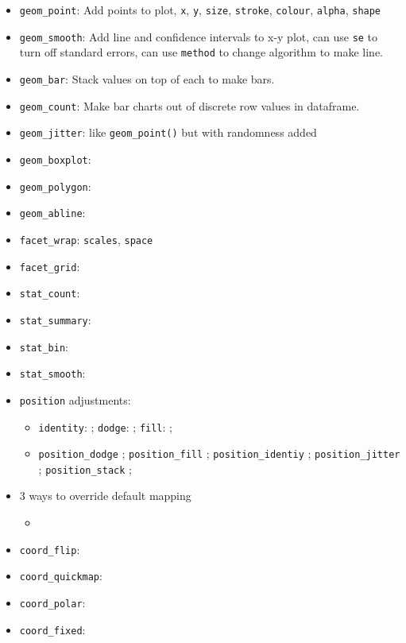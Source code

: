\documentclass[]{book}
\providecommand{\tightlist}{%
  \setlength{\itemsep}{0pt}\setlength{\parskip}{0pt}}
\theoremstyle{definition}
\theoremstyle{definition}
\theoremstyle{definition}
\theoremstyle{remark}
\begin{document}
\begin{itemize}
\tightlist
\item
  \texttt{geom\_point}: Add points to plot, \texttt{x}, \texttt{y},
  \texttt{size}, \texttt{stroke}, \texttt{colour}, \texttt{alpha},
  \texttt{shape}
\item
  \texttt{geom\_smooth}: Add line and confidence intervals to x-y plot,
  can use \texttt{se} to turn off standard errors, can use
  \texttt{method} to change algorithm to make line.
\item
  \texttt{geom\_bar}: Stack values on top of each to make bars.
\item
  \texttt{geom\_count}: Make bar charts out of discrete row values in
  dataframe.
\item
  \texttt{geom\_jitter}: like \texttt{geom\_point()} but with randomness
  added
\item
  \texttt{geom\_boxplot}:
\item
  \texttt{geom\_polygon}:
\item
  \texttt{geom\_abline}:
\item
  \texttt{facet\_wrap}: \texttt{scales}, \texttt{space}
\item
  \texttt{facet\_grid}:
\item
  \texttt{stat\_count}:
\item
  \texttt{stat\_summary}:
\item
  \texttt{stat\_bin}:
\item
  \texttt{stat\_smooth}:
\item
  \texttt{position} adjustments:

  \begin{itemize}
  \tightlist
  \item
    \texttt{identity}: ; \texttt{dodge}: ; \texttt{fill}: ;
  \item
    \texttt{position\_dodge} ; \texttt{position\_fill} ;
    \texttt{position\_identiy} ; \texttt{position\_jitter} ;
    \texttt{position\_stack} ;
  \end{itemize}
\item
  3 ways to override default mapping

  \begin{itemize}
  \item
  \end{itemize}
\item
  \texttt{coord\_flip}:
\item
  \texttt{coord\_quickmap}:
\item
  \texttt{coord\_polar}:
\item
  \texttt{coord\_fixed}:
\end{itemize}
\end{document}
